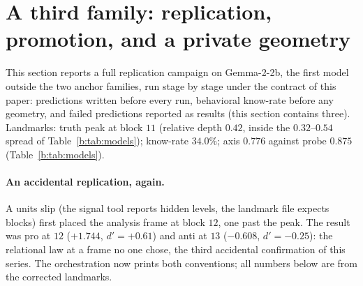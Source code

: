 \documentclass[11pt]{article}
\begin{document}
\section{A third family: replication, promotion, and a private geometry}
\label{b:sec:gemma}

This section reports a full replication campaign on Gemma-2-2b, the first
model outside the two anchor families, run stage by stage under the
contract of this paper: predictions written before every run, behavioral
know-rate before any geometry, and failed predictions reported as results
(this section contains three). Landmarks: truth peak at block $11$
(relative depth $0.42$, inside the $0.32$--$0.54$ spread of
Table~\ref{b:tab:models}); know-rate $34.0\%$; axis $0.776$ against probe
$0.875$ (Table~\ref{b:tab:models}).

\paragraph{An accidental replication, again.} A units slip (the signal
tool reports hidden levels, the landmark file expects blocks) first placed
the analysis frame at block $12$, one past the peak. The result was pro at
$12$ ($+1.744$, $d' = +0.61$) and anti at $13$ ($-0.608$, $d' = -0.25$):
the relational law at a frame no one chose, the third accidental
confirmation of this series. The orchestration now prints both
conventions; all numbers below are from the corrected landmarks.
\end{document}
